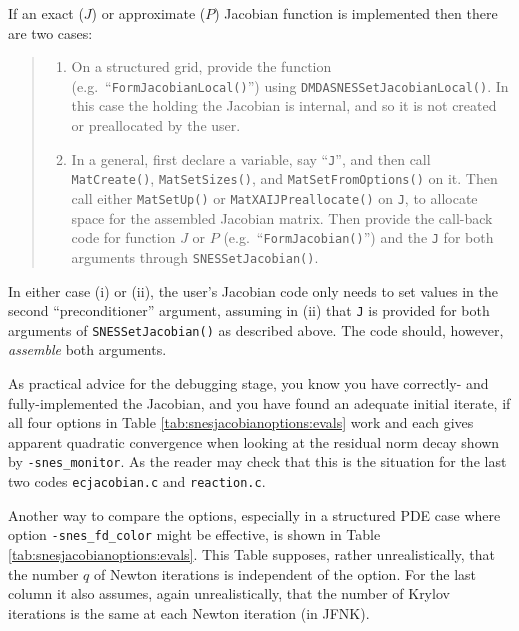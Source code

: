 If an exact ($J$) or approximate ($P$) Jacobian function is implemented then there are two cases:
\begin{quote}
  \renewcommand{\labelenumi}{(\roman{enumi})}
  \begin{enumerate}
  \item On a structured grid, provide the function (e.g.~``\texttt{FormJacobianLocal()}'') using \texttt{DMDASNESSetJacobianLocal()}.  In this case the \pMat holding the Jacobian is internal, and so it is not created or preallocated by the user.
  \item In a general, first declare a \pMat variable, say ``\texttt{J}'', and then call \texttt{MatCreate()}, \texttt{MatSetSizes()}, and \texttt{MatSetFromOptions()} on it.  Then call either \texttt{MatSetUp()} or \texttt{MatXAIJPreallocate()} on \texttt{J}, to allocate space for the assembled Jacobian matrix.  Then provide the call-back code for function $J$ or $P$ (e.g.~``\texttt{FormJacobian()}'') and the \pMat \texttt{J} for both \pMat arguments through \texttt{SNESSetJacobian()}.
  \end{enumerate}
\end{quote}
In either case (i) or (ii), the user's Jacobian code only needs to set values in the second ``preconditioner'' \pMat argument, assuming in (ii) that \texttt{J} is provided for both \pMat arguments of   \texttt{SNESSetJacobian()} as described above.  The code should, however, \emph{assemble} both \pMat arguments.

As practical advice for the debugging stage, you know you have correctly- and fully-implemented the Jacobian, and you have found an adequate initial iterate, if all four options in Table \ref{tab:snesjacobianoptions:evals} work and each gives apparent quadratic convergence when looking at the residual norm decay shown by \texttt{-snes\_monitor}.  As the reader may check that this is the situation for the last two codes \texttt{ecjacobian.c} and \texttt{reaction.c}.

Another way to compare the options, especially in a structured PDE case where option \texttt{-snes\_fd\_color} might be effective, is shown in Table \ref{tab:snesjacobianoptions:evals}.  This Table supposes, rather unrealistically, that the number $q$ of Newton iterations is independent of the option.  For the last column it also assumes, again unrealistically, that the number of Krylov iterations is the same at each Newton iteration (in JFNK).

